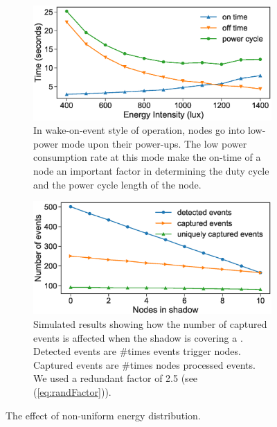 
\begin{figure}
    \begin{subfigure}{0.48\columnwidth}
        \includegraphics[width=\textwidth]{figures/BatterylessNodesDutyCycles_Sleep_mode}
        \caption{In wake-on-event style of operation, nodes go into low-power mode upon their power-ups. The low power consumption rate at this mode make the on-time of a node an important factor in determining the duty cycle and the power cycle length of the node.}
        \label{fig:differentEnergyIntensity}
    \end{subfigure}\hfill
    \begin{subfigure}{0.48\columnwidth}
        \includegraphics[width=\textwidth]{figures/different_energy_intensity}
        \caption{Simulated results showing how the number of captured events is affected when the shadow is covering a \cis. Detected events are \#times events trigger nodes. Captured events are \#times nodes processed events. We used a redundant factor of 2.5 (see (\ref{eq:randFactor})).}
        \label{fig:sim:differentEnergyIntensity}
    \end{subfigure}
    \vspace{-0.3cm}
    \caption{The effect of non-uniform energy distribution.}
    \label{fig:pwrCycleVSEnergyIntensity}
\end{figure}

